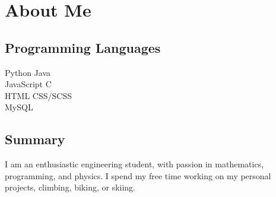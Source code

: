 \documentclass[]{deedy-resume-openfont}
\begin{document}
\section{About Me}
\begin{minipage}[t]{.35\textwidth}
	\subsection{Programming Languages}
	Python \textbullet{} Java \\
	JavaScript \textbullet{} C \\
	HTML \textbullet{} CSS/SCSS \\
	MySQL
	\sectionsep
\end{minipage}
\hfill
\begin{minipage}[t]{.55\textwidth}
	\subsection{Summary}
	I am an enthusiastic engineering student, with passion in mathematics, programming, and physics. I spend my free time working on my personal projects, climbing, biking, or skiing.

	\vspace{15pt}

\end{minipage}
\end{document}
